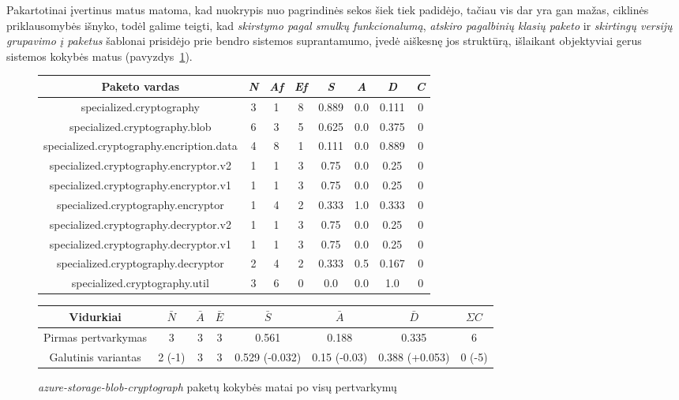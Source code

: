 Pakartotinai įvertinus matus matoma, kad nuokrypis nuo pagrindinės sekos šiek tiek padidėjo, tačiau
vis dar yra gan mažas, ciklinės priklausomybės išnyko, todėl galime teigti, kad \textit{skirstymo pagal smulkų funkcionalumą},
\textit{atskiro pagalbinių klasių paketo} ir \textit{skirtingų versijų grupavimo į paketus} šablonai prisidėjo prie bendro
sistemos suprantamumo, įvedė aiškesnę jos struktūrą, išlaikant objektyviai gerus sistemos kokybės matus (pavyzdys~\ref{table:verts}).
\begin{figure}[H]
\begin{center}
    \begin{tabular}{|c|c|c|c|c|c|c|c|}
        \hline
        Paketo vardas & \textit{N} & \textit{Af} & \textit{Ef} & \textit{S} & \textit{A} & \textit{D} & \textit{C} \\ [0.5ex]
        \hline\hline
        specialized.cryptography & 3 & 1 & 8 & 0.889 & 0.0 & 0.111 & 0 \\
        \hline
        specialized.cryptography.blob & 6 & 3 & 5 & 0.625 & 0.0 & 0.375 & 0 \\
        \hline
        specialized.cryptography.encription.data & 4 & 8 & 1 & 0.111 & 0.0 & 0.889 & 0 \\
        \hline
        specialized.cryptography.encryptor.v2 & 1 & 1 & 3 & 0.75 & 0.0 & 0.25 & 0 \\
        \hline
        specialized.cryptography.encryptor.v1 & 1 & 1 & 3 & 0.75 & 0.0 & 0.25 & 0 \\
        \hline
        specialized.cryptography.encryptor & 1 & 4 & 2 & 0.333 & 1.0 & 0.333 & 0 \\
        \hline
        specialized.cryptography.decryptor.v2 & 1 & 1 & 3 & 0.75 & 0.0 & 0.25 & 0 \\
        \hline
        specialized.cryptography.decryptor.v1 & 1 & 1 & 3 & 0.75 & 0.0 & 0.25 & 0 \\
        \hline
        specialized.cryptography.decryptor & 2 & 4 & 2 & 0.333 & 0.5 & 0.167 & 0 \\
        \hline
        specialized.cryptography.util & 3 & 6 & 0 & 0.0 & 0.0 & 1.0 & 0 \\
        \hline
    \end{tabular}
    \begin{tabular}{|c|c|c|c|c|c|c|c|}
        \hline
        Vidurkiai & $\bar{N}$ & $\bar{A}$ & $\bar{E}$ & $\bar{S}$ & $\bar{A}$ & $\bar{D}$ & $\Sigma C$ \\ [0.5ex]
        \hline\hline
        Pirmas pertvarkymas & 3 & 3 & 3 & 0.561 & 0.188 & 0.335 & 6 \\
        Galutinis variantas & \cellcolor{green!25} 2 (-1) & 3 & 3 & \cellcolor{green!25} 0.529 (-0.032) & \cellcolor{red!25} 0.15 (-0.03) & \cellcolor{red!25} 0.388 (+0.053) &  \cellcolor{green!25} 0 (-5) \\
        \hline
    \end{tabular}
\end{center}
\caption{\textit{azure-storage-blob-cryptograph} paketų kokybės matai po visų pertvarkymų}
\label{table:verts}
\end{figure}